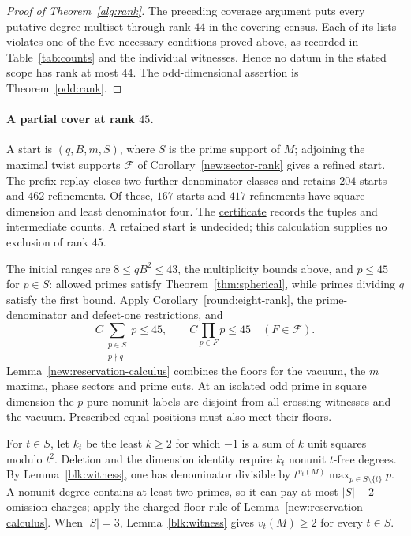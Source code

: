 \documentclass[11pt]{amsart}
\numberwithin{equation}{section}
\theoremstyle{definition}
\theoremstyle{plain}
\newcommand{\supfile}[2]{\href{run:rank-bound-supplement/#1}{#2}}
\begin{document}
\begin{proof}[Proof of Theorem~\ref{alg:rank}]
The preceding coverage argument puts every putative degree multiset
through rank $44$ in the covering census. Each of its lists violates
one of the five necessary conditions proved above, as recorded in
Table~\ref{tab:counts} and the individual witnesses. Hence no datum in
the stated scope has rank at most $44$. The odd-dimensional assertion is
Theorem~\ref{odd:rank}.
\end{proof}

\paragraph{A partial cover at rank $45$.}
A start is $(q,B,m,S)$, where $S$ is the prime support of $M$;
adjoining the maximal twist supports $\mathcal F$ of
Corollary~\ref{new:sector-rank} gives a refined start.
The \supfile{verification/sector_frontier/sector_prefix.py}{prefix replay}
closes two further denominator classes and retains $204$ starts and
$462$ refinements. Of these, $167$ starts and $417$ refinements have
square dimension and least denominator four. The
\supfile{verification/sector_frontier/sector-prefix45-depth2.json}{certificate}
records the tuples and intermediate counts. A retained start is
undecided; this calculation supplies no exclusion of rank $45$.

The initial ranges are $8\le qB^2\le43$, the multiplicity bounds
above, and $p\le45$ for $p\in S$: allowed primes satisfy
Theorem~\ref{thm:spherical}, while primes dividing $q$ satisfy the
first bound.
Apply Corollary~\ref{round:eight-rank}, the prime-denominator and
defect-one restrictions, and
\[
 C\sum_{\substack{p\in S\\p\nmid q}}p\le45,\qquad
 C\prod_{p\in F}p\le45\quad(F\in\mathcal F).
\]
Lemma~\ref{new:reservation-calculus} combines the floors for the
vacuum, the $m$ maxima, phase sectors and prime cuts. At an isolated
odd prime in square dimension the $p$ pure nonunit labels are
disjoint from all crossing witnesses and the vacuum.
Prescribed equal positions must also meet their floors.

For $t\in S$, let $k_t$ be the least $k\ge2$ for which $-1$ is a
sum of $k$ unit squares modulo $t^2$. Deletion and the dimension identity
require $k_t$ nonunit $t$-free degrees. By Lemma~\ref{blk:witness},
one has denominator divisible by
$t^{v_t(M)}\max_{p\in S\setminus\{t\}}p$.
A nonunit degree contains at least two primes, so it can pay at most
$|S|-2$ omission charges; apply the charged-floor rule of
Lemma~\ref{new:reservation-calculus}. When $|S|=3$,
Lemma~\ref{blk:witness} gives $v_t(M)\ge2$ for every $t\in S$.
\end{document}

